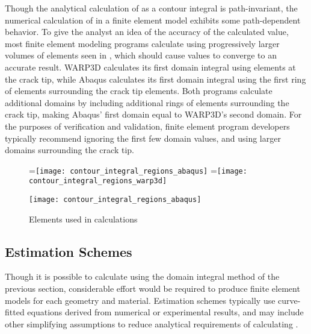 Though the analytical calculation of \J as a contour integral is path-invariant, the numerical calculation of \J in a finite element model exhibits some path-dependent behavior.
To give the analyst an idea of the accuracy of the calculated \J value, most finite element modeling programs calculate \J using progressively larger volumes of elements seen in , which should cause \J values to converge to an accurate result.
WARP3D calculates its first domain integral using elements at the crack tip, while Abaqus calculates its first domain integral using the first ring of elements surrounding the crack tip elements.
Both programs calculate additional \J domains by including additional rings of elements surrounding the crack tip, making Abaqus' first \J domain equal to WARP3D's second \J domain.
For the purposes of verification and validation, finite element program developers typically recommend ignoring the first few \J domain values, and using larger domains surrounding the crack tip.
\begin{figure}[tbp]
\centering
\begin{minipage}[b]{0.45\columnwidth}
=\hbox{\texttt{[image: contour\_integral\_regions\_abaqus]}}
=\hbox{\texttt{[image: contour\_integral\_regions\_warp3d]}}
\end{minipage}
\begin{minipage}[b]{0.45\columnwidth}
\texttt{[image: contour\_integral\_regions\_abaqus]}
\end{minipage}
\caption{\label{fig:fem-j-domains} Elements used in \J calculations}
\end{figure}

\subsection{Estimation Schemes}
\label{sec:estimation}

Though it is possible to calculate \J using the domain integral method of the previous section, considerable effort would be required to produce finite element models for each geometry and material.
Estimation schemes typically use curve-fitted equations derived from numerical or experimental results, and may include other simplifying assumptions to reduce analytical requirements of calculating \J.


